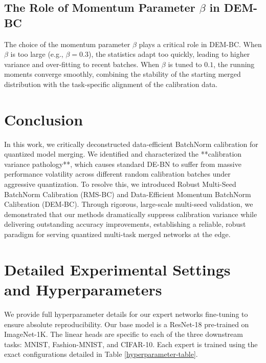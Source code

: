 \documentclass{article}
\begin{document}
\subsection{The Role of Momentum Parameter $\beta$ in DEM-BC}
The choice of the momentum parameter $\beta$ plays a critical role in DEM-BC. When $\beta$ is too large (e.g., $\beta = 0.3$), the statistics adapt too quickly, leading to higher variance and over-fitting to recent batches. When $\beta$ is tuned to $0.1$, the running moments converge smoothly, combining the stability of the starting merged distribution with the task-specific alignment of the calibration data.

\section{Conclusion}
In this work, we critically deconstructed data-efficient BatchNorm calibration for quantized model merging. We identified and characterized the **calibration variance pathology**, which causes standard DE-BN to suffer from massive performance volatility across different random calibration batches under aggressive quantization. To resolve this, we introduced Robust Multi-Seed BatchNorm Calibration (RMS-BC) and Data-Efficient Momentum BatchNorm Calibration (DEM-BC). Through rigorous, large-scale multi-seed validation, we demonstrated that our methods dramatically suppress calibration variance while delivering outstanding accuracy improvements, establishing a reliable, robust paradigm for serving quantized multi-task merged networks at the edge.




\clearpage
\appendix
\section{Detailed Experimental Settings and Hyperparameters}
We provide full hyperparameter details for our expert networks fine-tuning to ensure absolute reproducibility. Our base model is a ResNet-18 \cite{he16} pre-trained on ImageNet-1K. The linear heads are specific to each of the three downstream tasks: MNIST, Fashion-MNIST, and CIFAR-10. Each expert is trained using the exact configurations detailed in Table \ref{hyperparameter-table}.
\end{document}

